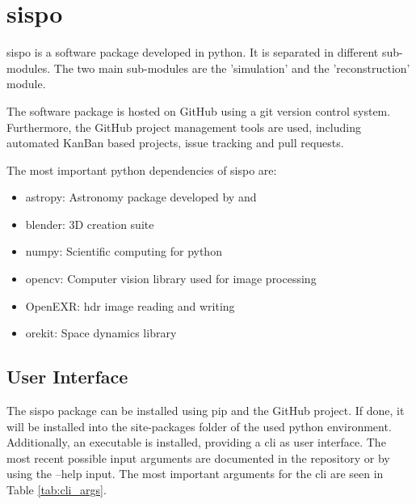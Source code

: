 \section{\Acrlong{sispo}}

\gls{sispo} is a software package developed in python. It is separated in different sub-modules. The two main sub-modules are the 'simulation' and the 'reconstruction' module.

The software package is hosted on GitHub using a git version control system. Furthermore, the GitHub project management tools are used, including automated KanBan based projects, issue tracking and pull requests.

The most important python dependencies of \gls{sispo} are:
\begin{itemize}
    \item astropy: Astronomy package developed by \cite{robitaille2013astropy} and \cite{price2018astropy}
    \item blender: 3D creation suite
    \item numpy: Scientific computing for python
    \item opencv: Computer vision library used for image processing
    \item OpenEXR: \gls{hdr} image reading and writing
    \item orekit: Space dynamics library
\end{itemize}

\subsection{User Interface}
The sispo package can be installed using pip and the GitHub project. If done, it will be installed into the site-packages folder of the used python environment. Additionally, an executable is installed, providing a \gls{cli} as user interface. The most recent possible input arguments are documented in the repository or by using the --help input. The most important arguments for the \gls{cli} are seen in Table \ref{tab:cli_args}.

